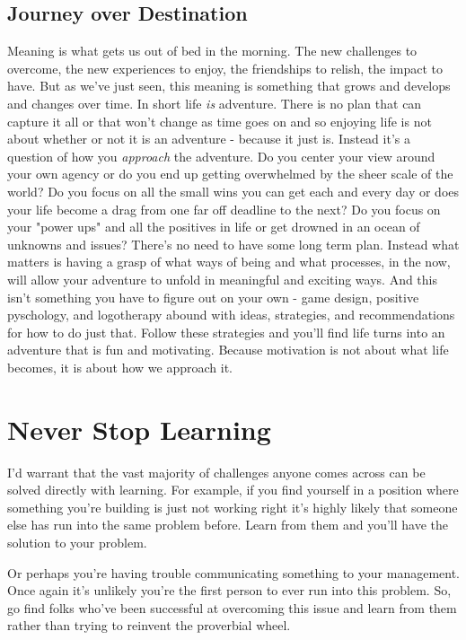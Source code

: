 \documentclass[11pt,a5paper]{book}
\begin{document}
\section{Journey over Destination}
Meaning is what gets us out of bed in the morning. The new challenges to overcome, the new experiences to enjoy, the friendships to relish, the impact to have. But as we've just seen, this meaning is something that grows and develops and changes over time. In short life \textit{is} adventure. There is no plan that can capture it all or that won't change as time goes on and so enjoying life is not about whether or not it is an adventure - because it just is. Instead it's a question of how you \textit{approach} the adventure. Do you center your view around your own agency or do you end up getting overwhelmed by the sheer scale of the world? Do you focus on all the small wins you can get each and every day or does your life become a drag from one far off deadline to the next? Do you focus on your "power ups" and all the positives in life or get drowned in an ocean of unknowns and issues? There's no need to have some long term plan. Instead what matters is having a grasp of what ways of being and what processes, in the now, will allow your adventure to unfold in meaningful and exciting ways. And this isn't something you have to figure out on your own - game design, positive pyschology, and logotherapy abound with ideas, strategies, and recommendations for how to do just that. Follow these strategies and you'll find life turns into an adventure that is fun and motivating. Because motivation is not about what life becomes, it is about how we approach it.

\chapter{Never Stop Learning}
I'd warrant that the vast majority of challenges anyone comes across can be solved directly with learning. For example, if you find yourself in a position where something you're building is just not working right it's highly likely that someone else has run into the same problem before. Learn from them and you'll have the solution to your problem. 
\newline

Or perhaps you're having trouble communicating something to your management. Once again it's unlikely you're the first person to ever run into this problem. So, go find folks who've been successful at overcoming this issue and learn from them rather than trying to reinvent the proverbial wheel. 
\newline
\end{document}

